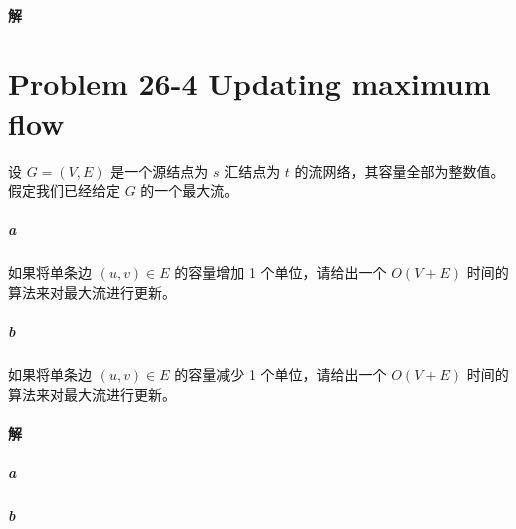\documentclass{article}
\begin{document}
\paragraph{解}


\section{Problem 26-4 Updating maximum flow}
设 $G = (V,E)$ 是一个源结点为 $s$ 汇结点为 $t$ 的流网络，其容量全部为整数值。假定我们已经给定 $G$ 的一个最大流。
\subparagraph{a} 如果将单条边 $(u, v) \in E$ 的容量增加 1 个单位，请给出一个 $O(V + E)$ 时间的算法来对最大流进行更新。
\subparagraph{b} 如果将单条边 $(u, v) \in E$ 的容量减少 1 个单位，请给出一个 $O(V + E)$ 时间的算法来对最大流进行更新。


\paragraph{解}
\subparagraph{a}

\subparagraph{b}
\end{document}
